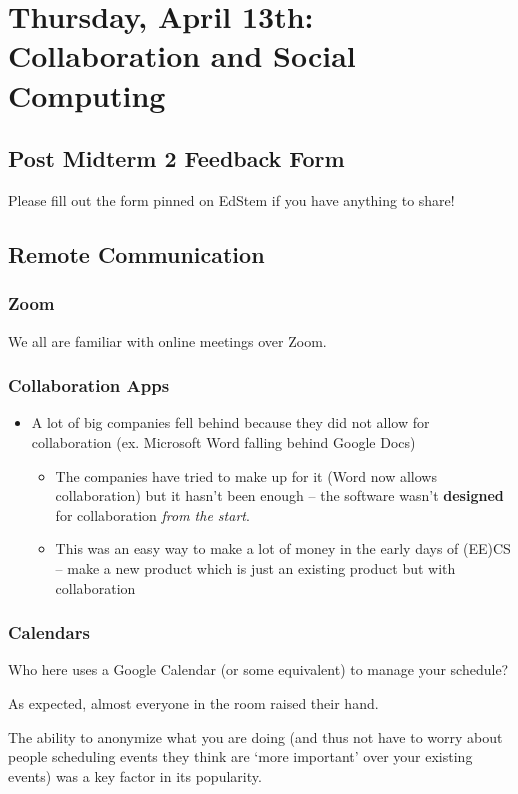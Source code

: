 \section{Thursday, April 13th: Collaboration and Social Computing}
\subsection{Post Midterm 2 Feedback Form}
Please fill out the form pinned on EdStem if you have anything to share!

\subsection{Remote Communication}
\subsubsection{Zoom}
We all are familiar with online meetings over Zoom.


\subsubsection{Collaboration Apps}
\begin{itemize}
    \item A lot of big companies fell behind because they did not allow for collaboration (ex. Microsoft Word falling behind Google Docs)
    \begin{itemize}
        \item The companies have tried to make up for it (Word now allows collaboration) but it hasn't been enough -- the software wasn't \textbf{designed} for collaboration \textit{from the start}.
        \item This was an easy way to make a lot of money in the early days of (EE)CS -- make a new product which is just an existing product but with collaboration
    \end{itemize}
\end{itemize}

\subsubsection{Calendars}
\begin{shaded}
Who here uses a Google Calendar (or some equivalent) to manage your schedule?
\end{shaded}
As expected, almost everyone in the room raised their hand.

The ability to anonymize what you are doing (and thus not have to worry about people scheduling events they think are `more important' over your existing events) was a key factor in its popularity.


